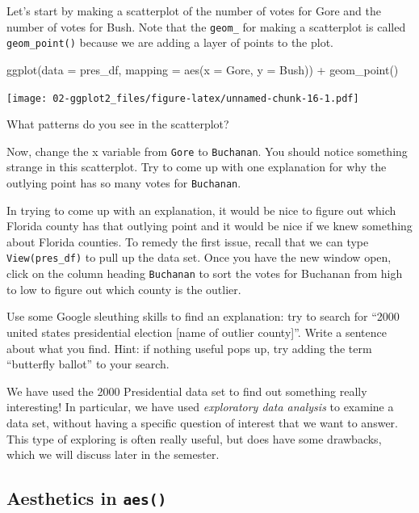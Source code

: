 \documentclass[
]{book}
\newenvironment{Shaded}{\begin{snugshade}}{\end{snugshade}}
\newcommand{\AttributeTok}[1]{\textcolor[rgb]{0.77,0.63,0.00}{#1}}
\newcommand{\FunctionTok}[1]{\textcolor[rgb]{0.00,0.00,0.00}{#1}}
\newcommand{\NormalTok}[1]{#1}
\newcommand{\SpecialCharTok}[1]{\textcolor[rgb]{0.00,0.00,0.00}{#1}}
\begin{document}
Let's start by making a scatterplot of the number of votes for Gore and the number of votes for Bush. Note that the \texttt{geom\_} for making a scatterplot is called \texttt{geom\_point()} because we are adding a layer of points to the plot.

\begin{Shaded}
\begin{Highlighting}[]
\FunctionTok{ggplot}\NormalTok{(}\AttributeTok{data =}\NormalTok{ pres\_df, }\AttributeTok{mapping =} \FunctionTok{aes}\NormalTok{(}\AttributeTok{x =}\NormalTok{ Gore, }\AttributeTok{y =}\NormalTok{ Bush)) }\SpecialCharTok{+}
  \FunctionTok{geom\_point}\NormalTok{()}
\end{Highlighting}
\end{Shaded}

\texttt{[image: 02-ggplot2\_files/figure-latex/unnamed-chunk-16-1.pdf]}

What patterns do you see in the scatterplot?

Now, change the x variable from \texttt{Gore} to \texttt{Buchanan}. You should notice something strange in this scatterplot. Try to come up with one explanation for why the outlying point has so many votes for \texttt{Buchanan}.

In trying to come up with an explanation, it would be nice to figure out which Florida county has that outlying point and it would be nice if we knew something about Florida counties. To remedy the first issue, recall that we can type \texttt{View(pres\_df)} to pull up the data set. Once you have the new window open, click on the column heading \texttt{Buchanan} to sort the votes for Buchanan from high to low to figure out which county is the outlier.

Use some Google sleuthing skills to find an explanation: try to search for ``2000 united states presidential election {[}name of outlier county{]}''. Write a sentence about what you find. Hint: if nothing useful pops up, try adding the term ``butterfly ballot'' to your search.

We have used the 2000 Presidential data set to find out something really interesting! In particular, we have used \emph{exploratory data analysis} to examine a data set, without having a specific question of interest that we want to answer. This type of exploring is often really useful, but does have some drawbacks, which we will discuss later in the semester.

\hypertarget{aesthetics-in-aes}{%
\subsection{\texorpdfstring{Aesthetics in \texttt{aes()}}{Aesthetics in aes()}}\label{aesthetics-in-aes}}
\end{document}
